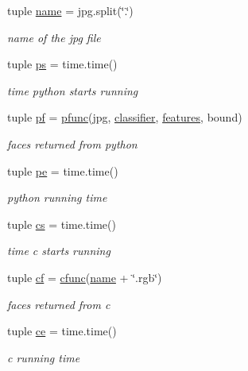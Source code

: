 \begin{DoxyCompactItemize}
tuple \hyperlink{namespacecompare_a9224020c6bf7df9437049feaa2622d71}{name} = jpg.\+split(\char`\"{}.\char`\"{})
\begin{DoxyCompactList}\small\item\em name of the jpg file \end{DoxyCompactList}\item 
tuple \hyperlink{namespacecompare_accd40faa0aeb12a425478f97f8fda2dd}{ps} = time.\+time()
\begin{DoxyCompactList}\small\item\em time python starts running \end{DoxyCompactList}\item 
tuple \hyperlink{namespacecompare_aef7f0f6d99cb687ae445a08bd0aaa529}{pf} = \hyperlink{namespacecompare_ab0b90ece2676a4ed2b6a0b9c0a586cfb}{pfunc}(jpg, \hyperlink{namespacecompare_a2e7fcdc543e6a0fde614081764c7b5f8}{classifier}, \hyperlink{namespacecompare_a54c639c8b89bbd55f7362ec8285739bc}{features}, bound)
\begin{DoxyCompactList}\small\item\em faces returned from python \end{DoxyCompactList}\item 
tuple \hyperlink{namespacecompare_a2a03a17585ac65fef036ccc1f66d01e0}{pe} = time.\+time()
\begin{DoxyCompactList}\small\item\em python running time \end{DoxyCompactList}\item 
tuple \hyperlink{namespacecompare_a4b1cdf610b8347cc4d994fe187708545}{cs} = time.\+time()
\begin{DoxyCompactList}\small\item\em time c starts running \end{DoxyCompactList}\item 
tuple \hyperlink{namespacecompare_a51fb2e77be48389395beafd6d6756fa9}{cf} = \hyperlink{namespacecompare_aa0c59464d2339c77a1d07202f854b8da}{cfunc}(\hyperlink{namespacecompare_a9224020c6bf7df9437049feaa2622d71}{name} + \char`\"{}.rgb\char`\"{})
\begin{DoxyCompactList}\small\item\em faces returned from c \end{DoxyCompactList}\item 
tuple \hyperlink{namespacecompare_a7387240bcc549d8e8a3dc6ad7ad9e51e}{ce} = time.\+time()
\begin{DoxyCompactList}\small\item\em c running time \end{DoxyCompactList}\end{DoxyCompactItemize}


